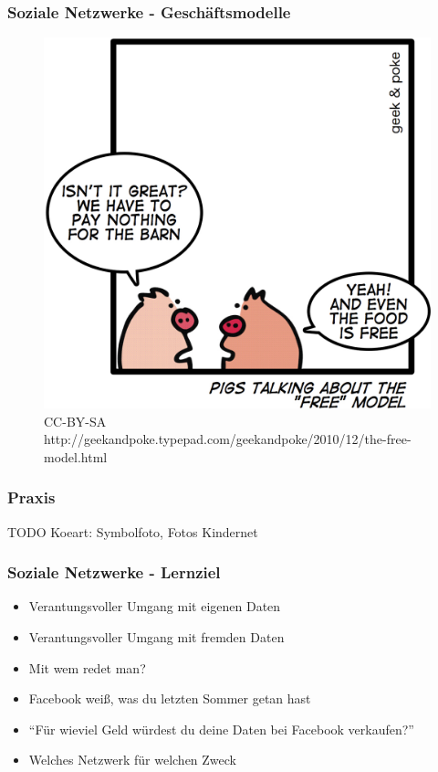 \documentclass{beamer}
\begin{document}
\begin{frame}
  \frametitle{Soziale Netzwerke - Geschäftsmodelle}
  \begin{figure}
    \includegraphics[height=0.6\textheight]{img/business_pigs.jpg}
    \caption{CC-BY-SA http://geekandpoke.typepad.com/geekandpoke/2010/12/the-free-model.html}
  \end{figure}
\end{frame}

\begin{frame}
  \frametitle{Praxis}
  TODO Koeart: Symbolfoto, Fotos Kindernet
\end{frame}

\begin{frame}
  \frametitle{Soziale Netzwerke - Lernziel}
  \begin{itemize}
    \item<2-> Verantungsvoller Umgang mit eigenen Daten
    \item<3-> Verantungsvoller Umgang mit fremden Daten
    \item<4-> Mit wem redet man?
    \item<5-> Facebook weiß, was du letzten Sommer getan hast
    \item<6-> "`Für wieviel Geld würdest du deine Daten bei Facebook verkaufen?"'
    \item<7-> Welches Netzwerk für welchen Zweck
  \end{itemize}
\end{frame}
\end{document}
